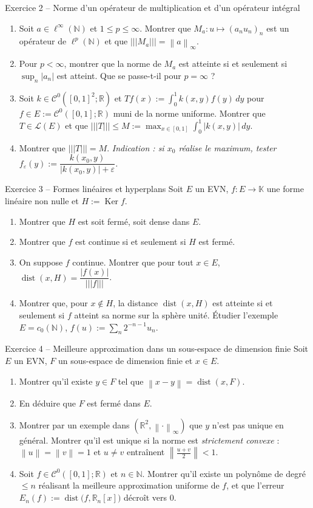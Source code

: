 \documentclass[11pt,a4paper]{article}
\newcommand{\R}{\mathbb{R}}
\newcommand{\N}{\mathbb{N}}
\newcommand{\K}{\mathbb{K}}
\newcommand{\dist}{\operatorname{dist}}
\newcommand{\norm}[1]{\left\|#1\right\|}
\newcommand{\opnorm}[1]{|\!|\!|#1|\!|\!|}
\newcommand{\Lc}{\mathcal{L}}
\newcommand{\Cz}{\mathcal{C}^0}
\DeclareMathOperator{\Ker}{Ker}
\theoremstyle{definition}
\begin{document}
\begin{exo}{Exercice 2 -- Norme d'un opérateur de multiplication et d'un opérateur intégral}
\begin{enumerate}[label=(\alph*)]
  \item Soit $a\in\ell^\infty(\N)$ et $1\le p\le\infty$. Montrer que $M_a:u\mapsto(a_nu_n)_n$ est un opérateur de $\ell^p(\N)$ et que $\opnorm{M_a}=\norm a_\infty$.
  \item Pour $p<\infty$, montrer que la norme de $M_a$ est atteinte si et seulement si $\sup_n|a_n|$ est atteint. Que se passe-t-il pour $p=\infty$ ?
  \item Soit $k\in\Cz([0,1]^2;\R)$ et $Tf(x):=\int_0^1k(x,y)f(y)\,dy$ pour $f\in E:=\Cz([0,1];\R)$ muni de la norme uniforme. Montrer que $T\in\Lc(E)$ et que $\opnorm T\le M:=\max_{x\in[0,1]}\int_0^1|k(x,y)|\,dy$.
  \item Montrer que $\opnorm T=M$. \emph{Indication : si $x_0$ réalise le maximum, tester $f_\varepsilon(y):=\dfrac{k(x_0,y)}{|k(x_0,y)|+\varepsilon}$.}
\end{enumerate}
\end{exo}

\begin{exo}{Exercice 3 -- Formes linéaires et hyperplans}
Soit $E$ un EVN, $f:E\to\K$ une forme linéaire non nulle et $H:=\Ker f$.
\begin{enumerate}[label=(\alph*)]
  \item Montrer que $H$ est soit fermé, soit dense dans $E$.
  \item Montrer que $f$ est continue si et seulement si $H$ est fermé.
  \item On suppose $f$ continue. Montrer que pour tout $x\in E$, $\dist(x,H)=\dfrac{|f(x)|}{\opnorm f}$.
  \item Montrer que, pour $x\notin H$, la distance $\dist(x,H)$ est atteinte si et seulement si $f$ atteint sa norme sur la sphère unité. Étudier l'exemple $E=c_0(\N)$, $f(u):=\sum_n2^{-n-1}u_n$.
\end{enumerate}
\end{exo}

\begin{exo}{Exercice 4 -- Meilleure approximation dans un sous-espace de dimension finie}
Soit $E$ un EVN, $F$ un sous-espace de dimension finie et $x\in E$.
\begin{enumerate}[label=(\alph*)]
  \item Montrer qu'il existe $y\in F$ tel que $\norm{x-y}=\dist(x,F)$.
  \item En déduire que $F$ est fermé dans $E$.
  \item Montrer par un exemple dans $(\R^2,\norm\cdot_\infty)$ que $y$ n'est pas unique en général. Montrer qu'il est unique si la norme est \emph{strictement convexe} : $\norm u=\norm v=1$ et $u\ne v$ entraînent $\norm{\frac{u+v}2}<1$.
  \item Soit $f\in\Cz([0,1];\R)$ et $n\in\N$. Montrer qu'il existe un polynôme de degré $\le n$ réalisant la meilleure approximation uniforme de $f$, et que l'erreur $E_n(f):=\dist\big(f,\R_n[x]\big)$ décroît vers $0$.
\end{enumerate}
\end{exo}
\end{document}
